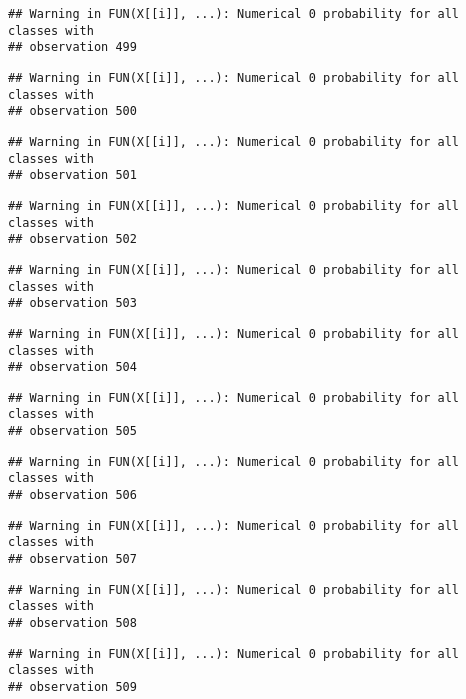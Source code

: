 \documentclass[
]{article}
\begin{document}
\begin{verbatim}
## Warning in FUN(X[[i]], ...): Numerical 0 probability for all classes with
## observation 499
\end{verbatim}

\begin{verbatim}
## Warning in FUN(X[[i]], ...): Numerical 0 probability for all classes with
## observation 500
\end{verbatim}

\begin{verbatim}
## Warning in FUN(X[[i]], ...): Numerical 0 probability for all classes with
## observation 501
\end{verbatim}

\begin{verbatim}
## Warning in FUN(X[[i]], ...): Numerical 0 probability for all classes with
## observation 502
\end{verbatim}

\begin{verbatim}
## Warning in FUN(X[[i]], ...): Numerical 0 probability for all classes with
## observation 503
\end{verbatim}

\begin{verbatim}
## Warning in FUN(X[[i]], ...): Numerical 0 probability for all classes with
## observation 504
\end{verbatim}

\begin{verbatim}
## Warning in FUN(X[[i]], ...): Numerical 0 probability for all classes with
## observation 505
\end{verbatim}

\begin{verbatim}
## Warning in FUN(X[[i]], ...): Numerical 0 probability for all classes with
## observation 506
\end{verbatim}

\begin{verbatim}
## Warning in FUN(X[[i]], ...): Numerical 0 probability for all classes with
## observation 507
\end{verbatim}

\begin{verbatim}
## Warning in FUN(X[[i]], ...): Numerical 0 probability for all classes with
## observation 508
\end{verbatim}

\begin{verbatim}
## Warning in FUN(X[[i]], ...): Numerical 0 probability for all classes with
## observation 509
\end{verbatim}
\end{document}
